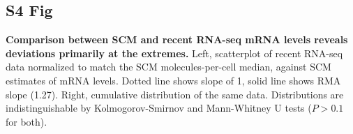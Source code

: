 \documentclass[10pt]{article}
\begin{document}
\subsection*{S4 Fig}
\label{S4_Fig}
{\bf Comparison between SCM and recent RNA-seq mRNA levels reveals deviations primarily at the extremes.} Left, scatterplot of recent RNA-seq data
normalized to match the SCM molecules-per-cell median, against SCM estimates of mRNA levels. Dotted line shows slope of 1, solid line shows RMA slope (1.27). Right, cumulative distribution of the same data. Distributions are indistinguishable by Kolmogorov-Smirnov and Mann-Whitney U tests ($P>0.1$ for both).
\end{document}
